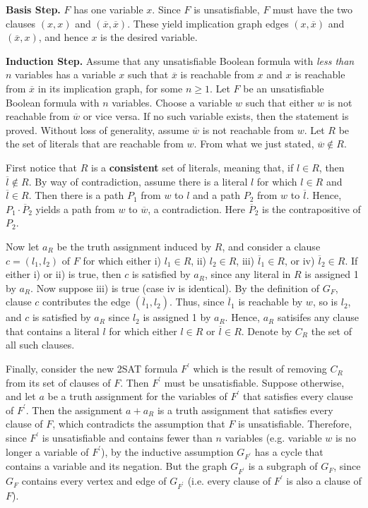 \documentclass [12pt]{article}
\theoremstyle{definition}
\begin{document}
{\bf Basis Step.} $F$ has one variable $x$. Since $F$ is unsatisfiable, $F$ must have the 
two clauses $(x,x)$ and $(\overline{x},\overline{x})$. These yield implication graph edges
$(x,\overline{x})$ and $(\overline{x},x)$, and hence $x$ is the desired variable. 


{\bf Induction Step.} Assume that any unsatisfiable Boolean formula with {\it less than} $n$ variables
 has a variable $x$ such that 
 $\overline{x}$ is reachable from $x$ and $x$ is reachable from $\overline{x}$ in its implication graph, for
some $n\geq 1$. Let $F$ be an unsatisfiable Boolean formula with $n$ variables. Choose a variable
$w$ such that either $w$  is not reachable from $\overline{w}$ or vice versa. If no such variable
exists, then the statement is proved. Without loss of generality, assume 
$\overline{w}$ is not reachable from $w$. Let $R$ be the set of literals that are reachable 
from $w$. From what we just stated, $\overline{w}\not\in R$. 


First notice that $R$ is a {\bf consistent} set of literals, meaning that, if $l\in R$,
then $\overline{l}\not\in R$. By way of contradiction, assume there is a literal $l$ for which
$l\in R$ and $\overline{l}\in R$. Then there is a path $P_{1}$ from $w$ to $l$ and 
a path $P_{2}$ from $w$ to $\overline{l}$.  Hence, $P_{1}\cdot \overline{P}_{2}$ yields a path 
from $w$ to $\overline{w}$, a contradiction. Here $\overline{P}_{2}$ is the contrapositive of $P_{2}$.


Now let $a_{R}$ be the truth assignment induced by $R$, and consider a clause $c=(l_{1},l_{2})$ of $F$ for which 
either i) $l_{1}\in R$, ii) $l_{2}\in R$, iii) $\overline{l}_{1}\in R$, or iv) $\overline{l}_{2}\in R$. If either i) or ii) is true, then
$c$ is satisfied by $a_{R}$, since any literal in $R$ is assigned 1 by $a_{R}$. Now suppose iii) is true (case iv is identical). 
By the definition of $G_{F}$, clause $c$ contributes the edge $(\overline{l}_{1},l_{2})$. Thus, since $\overline{l}_{1}$ is reachable by $w$, so is
$l_{2}$, and $c$ is satisfied by $a_{R}$ since $l_{2}$ is assigned 1 by $a_{R}$. Hence, $a_{R}$ satisifes any clause that contains a literal $l$ for which either 
$l\in R$ or $\overline{l}\in R$.  Denote by $C_{R}$ the set of all such clauses.

Finally, consider the new 2SAT formula $F^{\prime}$ which is the result of removing $C_{R}$ from its set of clauses of $F$. Then $F^{\prime}$ must be unsatisfiable. Suppose otherwise, and
let $a$ be a truth assignment for the variables of $F^{\prime}$ that satisfies every clause of $F^{\prime}$. Then the assignment $a+a_{R}$ is a truth assignment that satisfies every 
clause of $F$, which contradicts the assumption that $F$ is unsatisfiable. Therefore, since  $F^{\prime}$ is unsatisfiable and contains fewer than $n$ variables (e.g. variable $w$ is no longer a variable of
$F^{\prime}$), by the inductive assumption $G_{F^{\prime}}$ has a cycle that contains a variable and its negation. But the graph $G_{F^{\prime}}$ is a subgraph of $G_{F}$, since 
 $G_{F}$ contains every vertex and edge of  $G_{F^{\prime}}$ (i.e. every clause of $F^{\prime}$ is also a clause of $F$).
 
\end{document}
